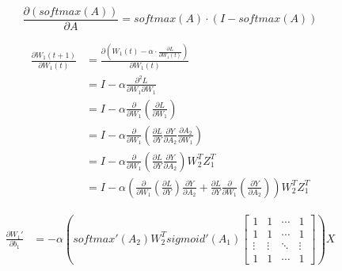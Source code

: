 \documentclass[12pt,a4paper]{amsart}
\begin{document}
\begin{equation}
	\frac{\partial (softmax(A))}{\partial A} = softmax(A) \cdot (I - softmax(A))
\end{equation}

\begin{equation}
	\begin{aligned}
		\frac{\partial W_1(t+1)}{\partial W_1(t)} & = \frac{\partial (W_1(t) - \alpha \cdot \frac{\partial L}{\partial W_1(t)})}{\partial W_1(t)} \\
		& = I - \alpha \frac{\partial^2 L}{\partial W_1 \partial W_1} \\
		& = I - \alpha \frac{\partial}{\partial W_1} \left( \frac{\partial L}{\partial W_1} \right) \\
		& = I - \alpha \frac{\partial}{\partial W_1} \left( \frac{\partial L}{\partial Y} \frac{\partial Y}{\partial A_2} \frac{\partial A_2}{\partial W_1} \right) \\
		& = I - \alpha \frac{\partial}{\partial W_1} \left( \frac{\partial L}{\partial Y} \frac{\partial Y}{\partial A_2} \right) W_2^T Z_1^T \\
		& = I - \alpha \left( \frac{\partial}{\partial W_1} \left( \frac{\partial L}{\partial Y} \right) \frac{\partial Y}{\partial A_2} + \frac{\partial L}{\partial Y} \frac{\partial}{\partial W_1} \left( \frac{\partial Y}{\partial A_2} \right) \right) W_2^T Z_1^T
	\end{aligned}
\end{equation}

\begin{equation}
	\begin{aligned}
		\frac{\partial {W_1}'}{\partial b_1} & = - \alpha \left( softmax'(A_2) W_2^T sigmoid'(A_1) \begin{bmatrix}
			1      & 1      & \cdots & 1      \\
			1      & 1      & \cdots & 1      \\
			\vdots & \vdots & \ddots & \vdots \\
			1      & 1      & \cdots & 1
		\end{bmatrix} \right) X
	\end{aligned}
\end{equation}
\end{document}
